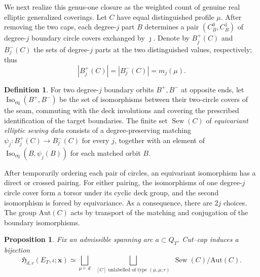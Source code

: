 \documentclass[11pt,a4paper,reqno]{article}
\newtheorem{proposition}[theorem]{Proposition}
\theoremstyle{definition}
\newtheorem{definition}[theorem]{Definition}
\theoremstyle{remark}
\newcommand\Aut{{\mathrm{Aut}}}
\begin{document}
We next realize this genus-one closure as the weighted count of genuine real elliptic generalized coverings.  Let $C$ have equal distinguished profile $\mu$.  After removing the two caps, each degree-$j$ part $B$ determines a pair $(C_B^0,C_B^1)$ of degree-$j$ boundary circle covers exchanged by $\jmath$.  Denote by $B_j^+(C)$ and $B_j^-(C)$ the sets of degree-$j$ parts at the two distinguished values, respectively; thus
\[
|B_j^+(C)|=|B_j^-(C)|=m_j(\mu).
\]

\begin{definition}\label{def:closure-datum}
For two degree-$j$ boundary orbits $B^+,B^-$ at opposite ends, let $\operatorname{Iso}_{\mathrm{eq}}(B^+,B^-)$ be the set of isomorphisms between their two-circle covers of the seam, commuting with the deck involutions and covering the prescribed identification of the target boundaries.  The finite set $\operatorname{Sew}(C)$ of \emph{equivariant elliptic sewing data} consists of a degree-preserving matching $\psi_j:B_j^+(C)\to B_j^-(C)$ for every $j$, together with an element of $\operatorname{Iso}_{\mathrm{eq}}(B,\psi_j(B))$ for each matched orbit $B$.
\end{definition}

After temporarily ordering each pair of circles, an equivariant isomorphism has a direct or crossed pairing.  For either pairing, the isomorphisms of one degree-$j$ circle cover form a torsor under its cyclic deck group, and the second isomorphism is forced by equivariance.  As a consequence, there are $2j$ choices.  The group $\Aut(C)$ acts by transport of the matching and conjugation of the boundary isomorphisms.

\begin{proposition}\label{prop:cut-cap}
Fix an admissible spanning arc $a\subset Q_T$.  Cut--cap induces a bijection
\begin{equation}\label{eq:cut-cap-classification}
\mathfrak H_{d,r}(E_T,\iota;\mathbf x) \simeq \bigsqcup_{\mu\vdash d} \ \bigsqcup_{\substack{[C]\text{ unlabelled of type }(\mu,\mu;r)}} \operatorname{Sew}(C)/\Aut(C).
\end{equation}
\end{proposition}
\end{document}
